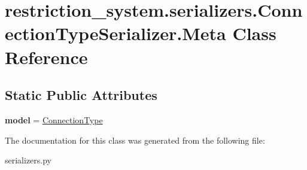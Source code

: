 \hypertarget{classrestriction__system_1_1serializers_1_1ConnectionTypeSerializer_1_1Meta}{}\section{restriction\+\_\+system.\+serializers.\+Connection\+Type\+Serializer.\+Meta Class Reference}
\label{classrestriction__system_1_1serializers_1_1ConnectionTypeSerializer_1_1Meta}
\subsection*{Static Public Attributes}
\begin{DoxyCompactItemize}
\item 
\hypertarget{classrestriction__system_1_1serializers_1_1ConnectionTypeSerializer_1_1Meta_ab58548b08145ab6fe87f66786f8fd4ce}{}{\bfseries model} = \hyperlink{classrestriction__system_1_1models_1_1ConnectionType}{Connection\+Type}\label{classrestriction__system_1_1serializers_1_1ConnectionTypeSerializer_1_1Meta_ab58548b08145ab6fe87f66786f8fd4ce}

\end{DoxyCompactItemize}


The documentation for this class was generated from the following file\+:\begin{DoxyCompactItemize}
\item 
serializers.\+py\end{DoxyCompactItemize}
